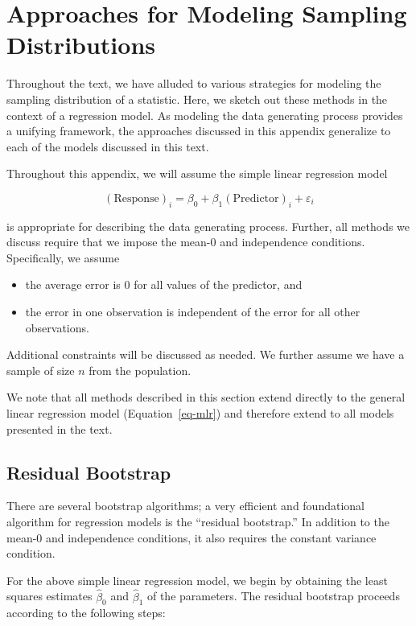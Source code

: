\documentclass[
  letterpaper,
  DIV=11,
  numbers=noendperiod]{scrreprt}
\providecommand{\tightlist}{%
  \setlength{\itemsep}{0pt}\setlength{\parskip}{0pt}}\usepackage{longtable,booktabs,array}
\theoremstyle{plain}
\theoremstyle{definition}
\theoremstyle{definition}
\theoremstyle{remark}
\begin{document}
\cleardoublepage
{}
{}
\appendix

\chapter{Approaches for Modeling Sampling
Distributions}\label{sec-app-theory}

Throughout the text, we have alluded to various strategies for modeling
the sampling distribution of a statistic. Here, we sketch out these
methods in the context of a regression model. As modeling the data
generating process provides a unifying framework, the approaches
discussed in this appendix generalize to each of the models discussed in
this text.

Throughout this appendix, we will assume the simple linear regression
model

\[(\text{Response})_i = \beta_0 + \beta_1 (\text{Predictor})_i + \varepsilon_i\]

is appropriate for describing the data generating process. Further, all
methods we discuss require that we impose the mean-0 and independence
conditions. Specifically, we assume

\begin{itemize}
\tightlist
\item
  the average error is 0 for all values of the predictor, and
\item
  the error in one observation is independent of the error for all other
  observations.
\end{itemize}

Additional constraints will be discussed as needed. We further assume we
have a sample of size \(n\) from the population.

We note that all methods described in this section extend directly to
the general linear regression model (Equation~\ref{eq-mlr}) and
therefore extend to all models presented in the text.

\section{Residual Bootstrap}\label{residual-bootstrap}

There are several bootstrap algorithms; a very efficient and
foundational algorithm for regression models is the ``residual
bootstrap.'' In addition to the mean-0 and independence conditions, it
also requires the constant variance condition.

For the above simple linear regression model, we begin by obtaining the
least squares estimates \(\widehat{\beta}_0\) and \(\widehat{\beta}_1\)
of the parameters. The residual bootstrap proceeds according to the
following steps:
\end{document}
